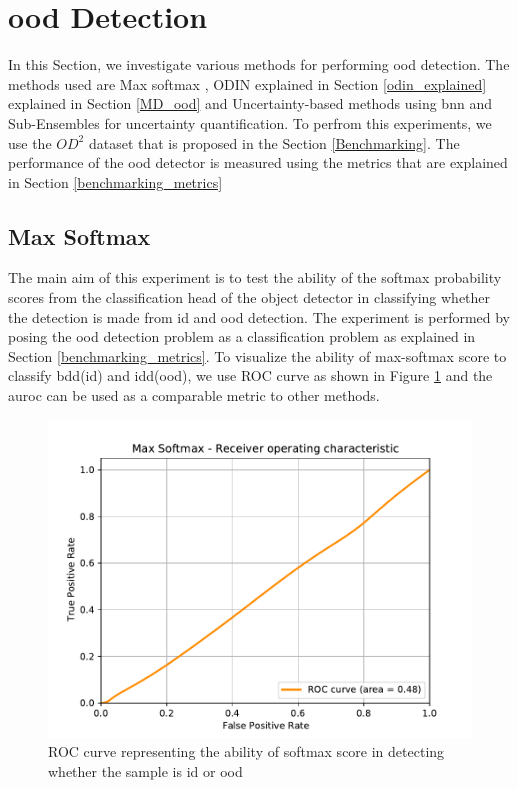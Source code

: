     \section{\acrlong{ood} Detection}
    In this Section, we investigate various methods for performing \acrshort{ood} detection. The methods used are Max softmax \cite{hendrycks17baseline}, ODIN \cite{Liang2017} explained in Section \ref{odin_explained} explained in Section \ref{MD_ood} and Uncertainty-based methods \cite{Malinin2018, Oberdiek, Oberdiek2018} using \acrshort{bnn} and Sub-Ensembles for uncertainty quantification. To perfrom this experiments, we use the $OD^{2}$ dataset that is proposed in the Section \ref{Benchmarking}. The performance of the \acrshort{ood} detector is measured using the metrics that are explained in Section \ref{benchmarking_metrics} 
    \subsection{Max Softmax}
    \label{max_softmax_exp}
    The main aim of this experiment is to test the ability of the softmax probability scores from the classification head of the object detector in classifying whether the detection is made from \acrshort{id} and \acrshort{ood} detection. The experiment is performed by posing the \acrshort{ood} detection problem as a classification problem as explained in Section \ref{benchmarking_metrics}. To visualize the ability of max-softmax score to classify \acrshort{bdd}(\acrshort{id}) and \acrshort{idd}(\acrshort{ood}), we use ROC curve as shown in Figure \ref{fig:maxsoftmax_roc} and the \acrlong{auroc} can be used as a comparable metric to other methods.
    
    \begin{figure}
        \centering
        \includegraphics[scale=0.5]{images/ROC/Max Softmax_ROC.pdf}
        \caption[ROC curve for \acrshort{ood} detection using softmax probability score]{ROC curve representing the ability of softmax score in detecting whether the sample is \acrlong{id} or \acrlong{ood}}
        \label{fig:maxsoftmax_roc}
    \end{figure}
    
